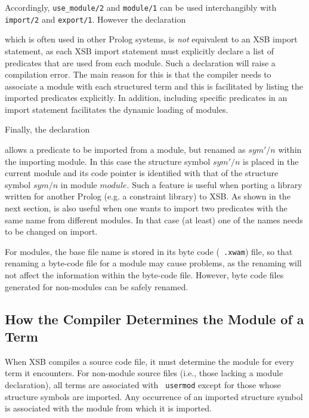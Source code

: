 
\noindent
Accordingly, {\tt use\_module/2} and {\tt module/1} can be used
interchangibly with {\tt import/2} and {\tt export/1}.  However the
declaration


\noindent
which is often used in other Prolog systems, is {\em not} equivalent
to an XSB import statement, as each XSB import statement must
explicitly declare a list of predicates that are used from each
module.  Such a declaration will raise a compilation error. The main
reason for this is that the compiler needs to associate a module with
each structured term and this is facilitated by listing the imported
predicates explicitly.  In addition, including specific predicates in
an import statement facilitates the dynamic loading of modules.

Finally, the declaration 


\noindent
allows a predicate to be imported from a module, but renamed as
$sym'/n$ within the importing module.  In this case the structure
symbol $sym'/n$ is placed in the current module and its code pointer
is identified with that of the structure symbol $sym/n$ in module
$module$.  Such a feature is useful when porting a library written for
another Prolog (e.g. a constraint library) to XSB.  As shown in the
next section, is also useful when one wants to import two predicates
with the same name from different modules.  In that case (at least)
one of the names needs to be changed on import.

For modules, the base file name is stored in its byte code ({\tt
  .xwam}) file, so that renaming a byte-code file for a module may cause
problems, as the renaming will not affect the information within the
byte-code file.  However, byte code files generated for non-modules
can be safely renamed.

\subsection{How the Compiler Determines the Module of a Term}

When XSB compiles a source code file, it must determine the module for
every term it encounters.  For non-module source files (i.e., those
lacking a module declaration), all terms are associated with {\tt
  usermod} except for those whose structure symbols are imported.  Any
occurrence of an imported structure symbol is associated with the
module from which it is imported.

